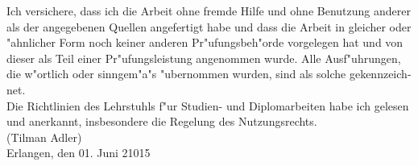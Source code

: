 \documentclass[english,bt]{package/lmedoc}
\begin{document}
{\begin{titlepage}
\begin{center}
    \vspace{3.5cm}

    \begin{minipage}{0.25\textwidth}
    \end{minipage}
    \qquad
    \begin{minipage}{0.6\textwidth}
    \vspace{7mm}
    \end{minipage}

    \end{center}

    \restoregeometry
    \end{titlepage}

    \setmainfont[   Path = fonts/,
                    BoldFont = BookmanOldStyleBold.ttf,
                    BoldItalicFont = BookmanOldStyleBoldItalic.ttf,
                    ItalicFont = BookmanOldStyleItalic.ttf]{BookmanOldStyle.ttf}
}{
  \begin{deckblatt}
  \end{deckblatt}
}

\cleardoublepage

\begin{otherlanguage}{ngerman}
Ich versichere, dass ich die Arbeit ohne fremde Hilfe und ohne Benutzung
anderer als der angegebenen Quellen angefertigt habe und dass die Arbeit
in glei\-cher oder "ahnlicher Form noch keiner anderen Pr"ufungsbeh"orde
vorgelegen hat und von dieser als Teil einer Pr"ufungsleistung
angenommen wurde. Alle Ausf"uhrungen, die w"ortlich oder sinngem"a"s
"ubernommen wurden, sind als solche gekennzeichnet.
\\

Die Richtlinien des Lehrstuhls f"ur Studien- und Diplomarbeiten
habe ich gelesen und anerkannt, insbesondere die Regelung des
Nutzungsrechts. \\[15mm]

\noindent (Tilman Adler)\\[15mm]
Erlangen, den 01. Juni 21015 \hspace{6.0cm} \\[10mm]
\end{otherlanguage}
\end{document}
